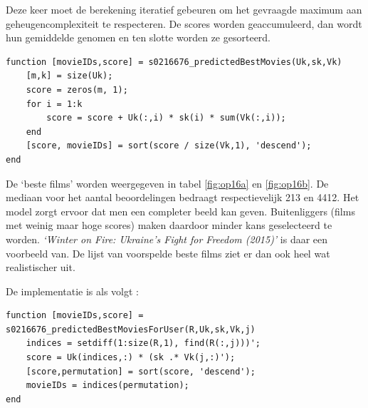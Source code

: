 

Deze keer moet de berekening iteratief gebeuren om het gevraagde maximum aan geheugencomplexiteit te respecteren. De scores worden geaccumuleerd, dan wordt hun gemiddelde genomen en ten slotte worden ze gesorteerd.

\begin{lstlisting}
function [movieIDs,score] = s0216676_predictedBestMovies(Uk,sk,Vk)
    [m,k] = size(Uk);
    score = zeros(m, 1);
    for i = 1:k
        score = score + Uk(:,i) * sk(i) * sum(Vk(:,i));
    end
    [score, movieIDs] = sort(score / size(Vk,1), 'descend');
end
\end{lstlisting}



De `beste films' worden weergegeven in tabel \ref{fig:op16a} en \ref{fig:op16b}. De mediaan voor het aantal beoordelingen bedraagt respectievelijk 213 en 4412. Het model zorgt ervoor dat men een completer beeld kan geven. Buitenliggers (films met weinig maar hoge scores) maken daardoor minder kans geselecteerd te worden. \textit{`Winter on Fire: Ukraine's Fight for Freedom (2015)'} is daar een voorbeeld van. De lijst van voorspelde beste films ziet er dan ook heel wat realistischer uit.



De implementatie is als volgt :

\begin{lstlisting}
function [movieIDs,score] = s0216676_predictedBestMoviesForUser(R,Uk,sk,Vk,j)
    indices = setdiff(1:size(R,1), find(R(:,j)))';
    score = Uk(indices,:) * (sk .* Vk(j,:)');
    [score,permutation] = sort(score, 'descend');
    movieIDs = indices(permutation);
end
\end{lstlisting}

\thispagestyle{empty}

